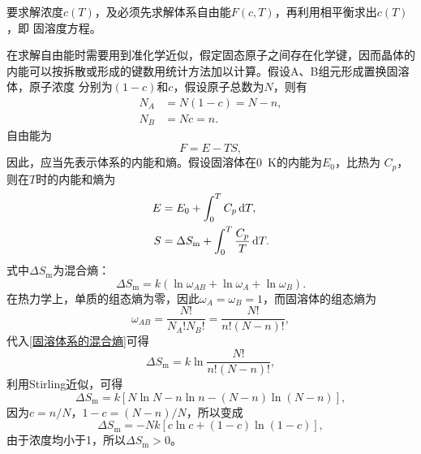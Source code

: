             要求解浓度$c(T)$，及必须先求解体系自由能$F(c,T)$，再利用相平衡求出$c(T)$，即
            固溶度方程。

            在求解自由能时需要用到准化学近似，假定固态原子之间存在化学键，因而晶体的
            内能可以按拆散或形成的键数用统计方法加以计算。假设A、B组元形成置换固溶体，原子浓度
            分别为$(1-c)$和$c$，假设原子总数为$N$，则有
            \begin{align}
                N_A&=N(1-c)=N-n,\\
                N_B&=Nc=n.
            \end{align}
            自由能为
            \begin{equation}
                F=E-TS,
            \end{equation}
            因此，应当先表示体系的内能和熵。假设固溶体在\SI{0}{\K}的内能为$E_0$，比热为
            $C_p$，则在$T$时的内能和熵为
            \begin{align}
                E&=E_0+\int_{0}^{T}C_p\mathop{}\!\mathrm{d} T,\\
                S&=\Delta S_{\mathrm{m}}+\int_{0}^{T}\frac{C_p}{T}\mathop{}\!\mathrm{d} T.
            \end{align}
            式中$\Delta S_{\mathrm{m}}$为混合熵：
            \begin{equation}
                \Delta S_{\mathrm{m}}=k\left( \ln\omega_{AB}+\ln\omega_{A}+\ln\omega_B \right)\label{固溶体系的混合熵}.
            \end{equation}
            在热力学上，单质的组态熵为零，因此$\omega_A=\omega_B=1$，而固溶体的组态熵为
            \begin{equation}
                \omega_{AB}=\frac{N!}{N_A!N_B!}=\frac{N!}{n!(N-n)!},
            \end{equation}
            代入\autoref{固溶体系的混合熵}可得
            \begin{equation}
                \Delta S_{\mathrm{m}}=k\ln\frac{N!}{n!(N-n)!},
            \end{equation}
            利用Stirling近似，可得
            \begin{equation}
                \Delta S_{\mathrm{m}}=k[N\ln N-n \ln n-(N-n) \ln (N-n)],
            \end{equation}
            因为$c=n/N$，$1-c=(N-n)/N$，所以变成
            \begin{equation}
                \Delta S_{\mathrm{m}}=-N k[c \ln c+(1-c) \ln (1-c)],
            \end{equation}
            由于浓度均小于1，所以$\Delta S_{\mathrm{m}}>0$。

